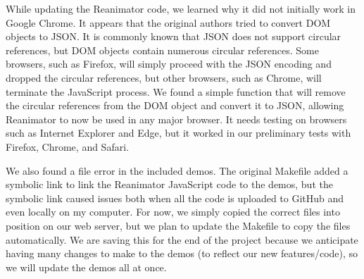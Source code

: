 \documentclass[12pt,journal]{IEEEtran}
\begin{document}
While updating the Reanimator code, we learned why it did not initially work in Google Chrome. It appears that the original authors tried to convert DOM objects to JSON. It is commonly known that JSON does not support circular references, but DOM objects contain numerous circular references. Some browsers, such as Firefox, will simply proceed with the JSON encoding and dropped the circular references, but other browsers, such as Chrome, will terminate the JavaScript process. We found a simple function that will remove the circular references from the DOM object and convert it to JSON, allowing Reanimator to now be used in any major browser. It needs testing on browsers such as Internet Explorer and Edge, but it worked in our preliminary tests with Firefox, Chrome, and Safari.

We also found a file error in the included demos. The original Makefile added a symbolic link to link the Reanimator JavaScript code to the demos, but the symbolic link caused issues both when all the code is uploaded to GitHub and even locally on my computer. For now, we simply copied the correct files into position on our web server, but we plan to update the Makefile to copy the files automatically. We are saving this for the end of the project because we anticipate having many changes to make to the demos (to reflect our new features/code), so we will update the demos all at once.







\printbibliography
\end{document}
